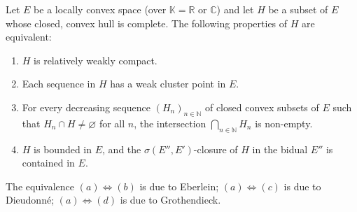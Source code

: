 Let $E$ be a locally convex space (over $\mathbb{K} = \mathbb{R}$ or $\mathbb{C}$) and let $H$ be a subset of $E$ whose closed, convex hull is complete. The following properties of $H$ are equivalent:
\begin{enumerate}
\item[(a)] $H$ is relatively weakly compact.
\item[(b)] Each sequence in $H$ has a weak cluster point in $E$.
\item[(c)] For every decreasing sequence $(H_n)_{n \in \mathbb{N}}$ of closed convex subsets of $E$ such that $H_n \cap H \neq \varnothing$ for all $n$, the intersection $\bigcap_{n \in \mathbb{N}} H_n$ is non-empty.
\item[(d)] $H$ is bounded in $E$, and the $\sigma(E'', E')$-closure of $H$ in the bidual $E''$ is contained in $E$.
\end{enumerate}
The equivalence $(a) \Leftrightarrow (b)$ is due to Eberlein; $(a) \Leftrightarrow (c)$ is due to Dieudonn\'e; $(a) \Leftrightarrow (d)$ is due to Grothendieck.
